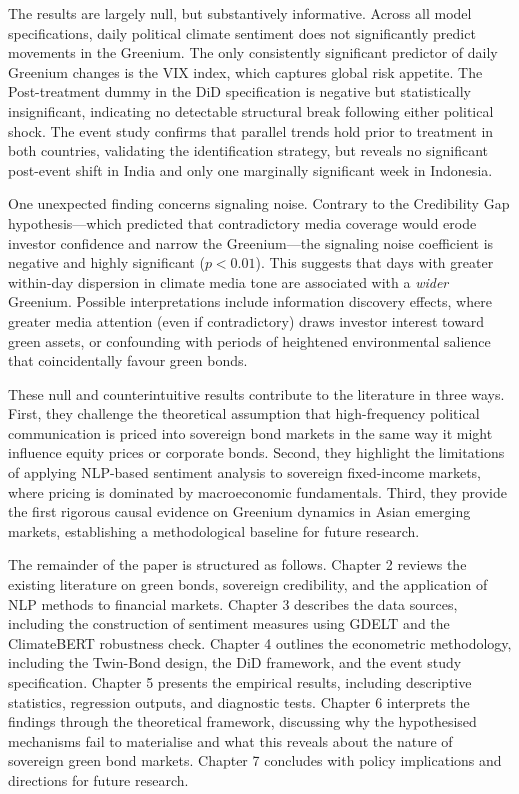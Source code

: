 \documentclass[12pt,a4paper]{article}
\begin{document}
The results are largely null, but substantively informative. Across all model specifications, daily political climate sentiment does not significantly predict movements in the Greenium. The only consistently significant predictor of daily Greenium changes is the VIX index, which captures global risk appetite. The Post-treatment dummy in the DiD specification is negative but statistically insignificant, indicating no detectable structural break following either political shock. The event study confirms that parallel trends hold prior to treatment in both countries, validating the identification strategy, but reveals no significant post-event shift in India and only one marginally significant week in Indonesia.

One unexpected finding concerns signaling noise. Contrary to the Credibility Gap hypothesis---which predicted that contradictory media coverage would erode investor confidence and narrow the Greenium---the signaling noise coefficient is negative and highly significant ($p < 0.01$). This suggests that days with greater within-day dispersion in climate media tone are associated with a \textit{wider} Greenium. Possible interpretations include information discovery effects, where greater media attention (even if contradictory) draws investor interest toward green assets, or confounding with periods of heightened environmental salience that coincidentally favour green bonds.

These null and counterintuitive results contribute to the literature in three ways. First, they challenge the theoretical assumption that high-frequency political communication is priced into sovereign bond markets in the same way it might influence equity prices or corporate bonds. Second, they highlight the limitations of applying NLP-based sentiment analysis to sovereign fixed-income markets, where pricing is dominated by macroeconomic fundamentals. Third, they provide the first rigorous causal evidence on Greenium dynamics in Asian emerging markets, establishing a methodological baseline for future research.


The remainder of the paper is structured as follows. Chapter 2 reviews the existing literature on green bonds, sovereign credibility, and the application of NLP methods to financial markets. Chapter 3 describes the data sources, including the construction of sentiment measures using GDELT and the ClimateBERT robustness check. Chapter 4 outlines the econometric methodology, including the Twin-Bond design, the DiD framework, and the event study specification. Chapter 5 presents the empirical results, including descriptive statistics, regression outputs, and diagnostic tests. Chapter 6 interprets the findings through the theoretical framework, discussing why the hypothesised mechanisms fail to materialise and what this reveals about the nature of sovereign green bond markets. Chapter 7 concludes with policy implications and directions for future research.
\end{document}
